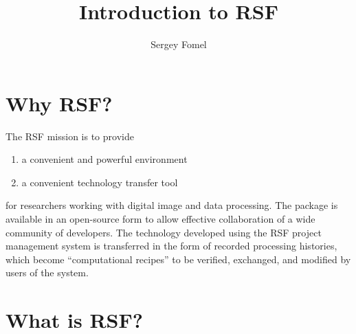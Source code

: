 \title{Introduction to RSF}
\author{Sergey Fomel}

\maketitle

\section{Why RSF?}

The RSF mission is to provide
\begin{enumerate}
\item a convenient and powerful environment
\item a convenient technology transfer tool
\end{enumerate}
for researchers working with digital image and data processing. The package is
available in an open-source form to allow effective collaboration of a wide
community of developers. The technology developed using the RSF project
management system is transferred in the form of recorded processing histories,
which become ``computational recipes'' to be verified, exchanged, and modified
by users of the system.

\section{What is RSF?}

